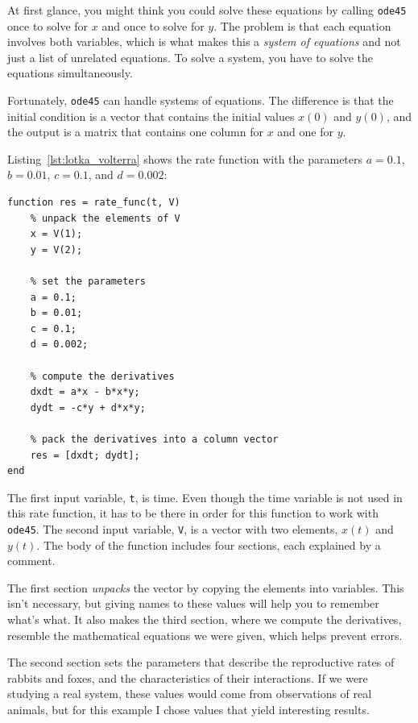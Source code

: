 At first glance, you might think you could solve these equations by
calling \lstinline{ode45} once to solve for $x$ and
once to solve for $y$.  The problem is that each equation involves
both variables, which is what makes this a \emph{system of equations}
and not just a list of unrelated equations.  To solve a system, you
have  to solve the equations simultaneously.


Fortunately, \lstinline{ode45} can handle systems of equations.  The
difference is that the initial condition is a vector that contains the
initial values $x(0)$ and $y(0)$, and the output is a matrix
that contains one column for $x$ and one for $y$.


Listing~\ref{lst:lotka_volterra} shows the rate function
with the parameters $a = 0.1$, $b = 0.01$, $c = 0.1$, and $d = 0.002$:

\begin{lstlisting}[caption={A rate function for Lotka-Volterra}, label={lst:lotka_volterra}]
function res = rate_func(t, V)
    % unpack the elements of V
    x = V(1);
    y = V(2);

    % set the parameters
    a = 0.1;
    b = 0.01;
    c = 0.1;
    d = 0.002;

    % compute the derivatives
    dxdt = a*x - b*x*y;
    dydt = -c*y + d*x*y;

    % pack the derivatives into a column vector
    res = [dxdt; dydt];
end
\end{lstlisting}

The first input variable, \lstinline{t}, is time.
Even though the time variable is not used in this rate function,
it has to be there in order for this function to work with \lstinline{ode45}.
The second input variable, \lstinline{V}, is a vector with two elements,
$x(t)$ and $y(t)$.
The body of the function includes four sections, each explained by a comment.

The first section \emph{unpacks} the vector by copying the elements
into variables.  This isn't necessary, but giving names to
these values will help you to remember what's what.  It also makes the third
section, where we compute the derivatives, resemble the mathematical
equations we were given, which helps prevent errors.


The second section sets the parameters that describe the
reproductive rates of rabbits and foxes, and the characteristics of
their interactions.  If we were studying a real system, these values
would come from observations of real animals, but for this example
I chose values that yield interesting results.

